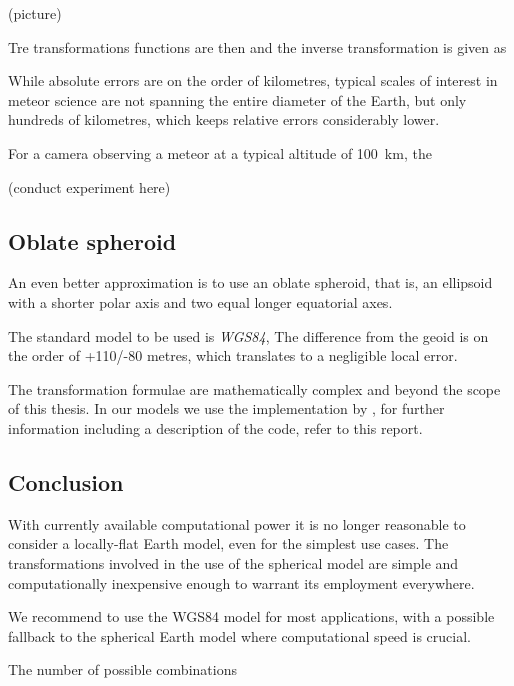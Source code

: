         (picture)

        Tre transformations functions are then
        and the inverse transformation is given as

        While absolute errors are on the order of kilometres, typical scales of interest
        in meteor science are not spanning the entire diameter of the Earth,
        but only hundreds of kilometres, which keeps relative errors considerably lower.

        For a camera observing a meteor at a typical altitude of \SI{100}{\kilo\metre},
        the 

        (conduct experiment here)


    \subsection{Oblate spheroid} \label{mmw}
        An even better approximation is to use an oblate spheroid,
        that is, an ellipsoid with a shorter polar axis and two
        equal longer equatorial axes.

        The standard model to be used is \emph{WGS84}, 
        The difference from the geoid is on the order of +110/-80 metres,
        which translates to a negligible local error.

        The transformation formulae are mathematically complex and beyond the scope of this thesis.
        In our models we use the implementation by \cite{osen2017},
        for further information including a description of the code, refer to this report.

    \subsection{Conclusion}
        With currently available computational power it is no longer reasonable to
        consider a locally-flat Earth model, even for the simplest use cases.
        The transformations involved in the use of the spherical model
        are simple and computationally inexpensive enough to warrant its employment everywhere.

        We recommend to use the WGS84 model for most applications, with a possible
        fallback to the spherical Earth model where computational speed is crucial.


The number of possible combinations


